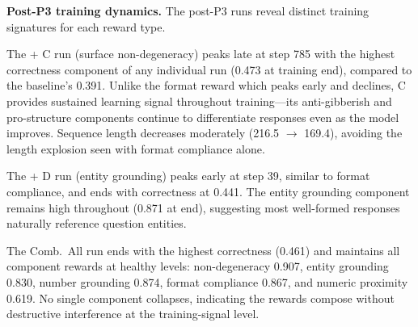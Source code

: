 \textbf{Post-P3 training dynamics.}
The post-P3 runs reveal distinct training signatures for each reward type.

The + C run (surface non-degeneracy) peaks late at step 785 with the highest correctness component of any individual run (0.473 at training end), compared to the baseline's 0.391.
Unlike the format reward which peaks early and declines, C provides sustained learning signal throughout training---its anti-gibberish and pro-structure components continue to differentiate responses even as the model improves.
Sequence length decreases moderately (216.5 $\to$ 169.4), avoiding the length explosion seen with format compliance alone.

The + D run (entity grounding) peaks early at step 39, similar to format compliance, and ends with correctness at 0.441.
The entity grounding component remains high throughout (0.871 at end), suggesting most well-formed responses naturally reference question entities.

The Comb.\ All run ends with the highest correctness (0.461) and maintains all component rewards at healthy levels: non-degeneracy 0.907, entity grounding 0.830, number grounding 0.874, format compliance 0.867, and numeric proximity 0.619.
No single component collapses, indicating the rewards compose without destructive interference at the training-signal level.
